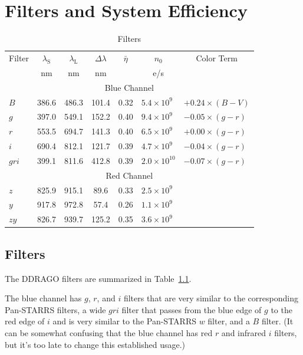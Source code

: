 \chapter{Filters and System Efficiency}

\begin{table}
\centering
\caption{Filters}
\medskip
\label{table:filters}
\footnotesize
\begin{tabular}{lcccccl}
\toprule
Filter&$\lambda_\mathrm{S}$&$\lambda_\mathrm{L}$&$\Delta\lambda$&$\bar\eta$&$n_0$&\multicolumn{1}{c}{Color Term}\\
&nm&nm&nm&&\unit{e/s}\\
\midrule
\multicolumn{7}{c}{Blue Channel}\\
\midrule
$B$   & 386.6 & 486.3 & \phantom{}101.4 & 0.32 & $5.4 \times 10^{9\phantom{0}}$ & $+0.24 \times (B-V)$\\
$g$   & 397.0 & 549.1 & \phantom{}152.2 & 0.40 & $9.4 \times 10^{9\phantom{0}}$ & $-0.05 \times (g-r)$\\
$r$   & 553.5 & 694.7 & \phantom{}141.3 & 0.40 & $6.5 \times 10^{9\phantom{0}}$& $+0.00 \times (g-r)$\\
$i$   & 690.4 & 812.1 & \phantom{}121.7 & 0.39 & $4.7 \times 10^{9\phantom{0}}$& $-0.04 \times (g-r)$\\
$gri$ & 399.1 & 811.6 & \phantom{}412.8 & 0.39 & $2.0 \times 10^{10\phantom{}}$& $-0.07 \times (g-r)$\\
\midrule
\multicolumn{7}{c}{Red Channel}\\
\midrule
$z$   & 825.9 & 915.1 & \phantom{0}89.6 & 0.33 & $2.5 \times 10^{9\phantom{0}}$& \\
$y$   & 917.8 & 972.8 & \phantom{0}57.4 & 0.26 & $1.1 \times 10^{9\phantom{0}}$\\
$zy$  & 826.7 & 939.7 & \phantom{}125.2 & 0.35 & $3.6 \times 10^{9\phantom{0}}$\\
\bottomrule
\end{tabular}
\end{table}


\section{Filters}

The DDRAGO filters are summarized in Table~\ref{table:filters}.

The blue channel has $g$, $r$, and $i$ filters that are very similar to the corresponding Pan-STARRS filters, a wide $gri$ filter that passes from the blue edge of $g$ to the red edge of $i$ and is very similar to the Pan-STARRS $w$ filter, and a $B$ filter. (It can be somewhat confusing that the blue channel has red $r$ and infrared $i$ filters, but it's too late to change this established usage.)

